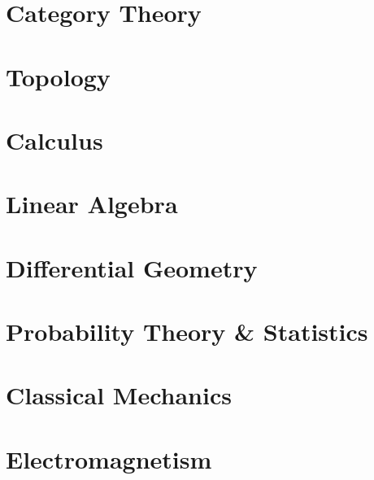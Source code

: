 \documentclass[11pt, a4paper]{report}
\begin{document}
\part{Category Theory}




\part{Topology}






\part{Calculus}








\part{Linear Algebra}








\part{Differential Geometry}\label{part:diffgeom}














\part{Probability Theory \& Statistics}


%

\part{Classical Mechanics}







\part{Electromagnetism}



\end{document}
